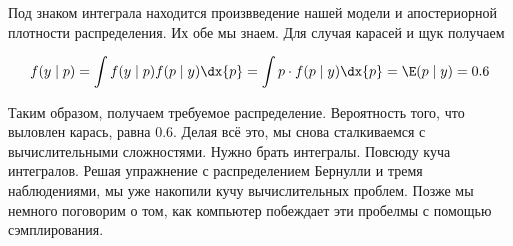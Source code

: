 \documentclass[12pt, a4paper, oneside]{article}
\begin{document}
Под знаком интеграла находится произвведение нашей модели и апостериорной плотности распределения. Их обе мы знаем. Для случая карасей и щук получаем

\[
f(y \mid p) = \int f(y \mid p) f(p \mid y) \dx{p} = \int p \cdot f(p \mid y) \dx{p} = \E(p \mid y) = 0.6
\]

Таким образом, получаем требуемое распределение. Вероятность того, что выловлен карась, равна $0.6$. Делая всё это, мы снова сталкиваемся с вычислительными сложностями. Нужно брать интегралы. Повсюду куча интегралов. Решая упражнение с распределением Бернулли и тремя наблюдениями, мы уже накопили кучу вычислительных проблем. Позже мы немного поговорим о том, как компьютер побеждает эти пробелмы с помощью сэмплирования.
\end{document}
